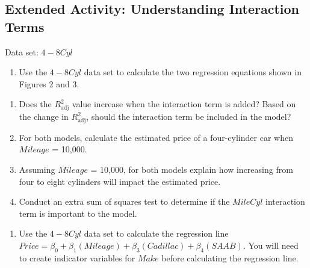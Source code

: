 \documentclass[
]{report}
\providecommand{\tightlist}{%
  \setlength{\itemsep}{0pt}\setlength{\parskip}{0pt}}
\begin{document}
\vspace*{2cm}

\subsection*{Extended Activity: Understanding Interaction Terms}\label{extended-activity-understanding-interaction-terms}

Data set: \(4-8Cyl\)

\begin{enumerate}
\def\labelenumi{\arabic{enumi}.}
\setcounter{enumi}{34}
\tightlist
\item
  Use the \(4-8Cyl\) data set to calculate the two regression equations shown in Figures 2 and 3.
\end{enumerate}

\begin{enumerate}
\def\labelenumi{\alph{enumi}.}
\tightlist
\item
  Does the \(R^2_{\text{adj}}\) value increase when the interaction term is added? Based on the change in \(R^2_{\text{adj}}\), should the interaction term be included in the model?
\item
  For both models, calculate the estimated price of a four-cylinder car when \(Mileage\) = 10,000.
\item
  Assuming \(Mileage\) = 10,000, for both models explain how increasing from four to eight cylinders will impact the estimated price.
\item
  Conduct an extra sum of squares test to determine if the \(MileCyl\) interaction term is important to the model.
\end{enumerate}

\begin{enumerate}
\def\labelenumi{\arabic{enumi}.}
\setcounter{enumi}{35}
\tightlist
\item
  Use the \(4-8Cyl\) data set to calculate the regression line \(Price = \beta_0 + \beta_1(Mileage) + \beta_3(Cadillac) + \beta_4(SAAB)\). You will need to create indicator variables for \(Make\) before calculating the regression line.
\end{enumerate}
\end{document}
